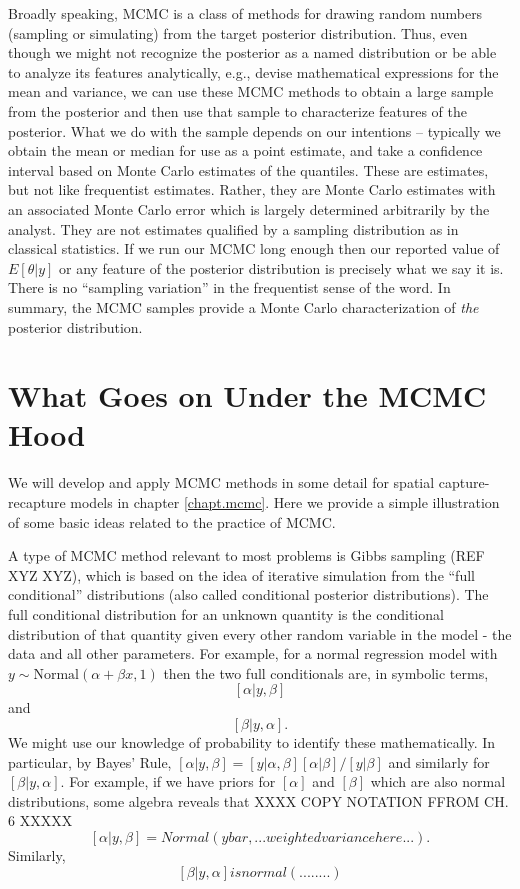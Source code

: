 Broadly speaking, MCMC is a class of methods for drawing random
numbers (sampling or simulating) from the target posterior
distribution.  Thus, even though we might not recognize the posterior
as a named distribution or be able to analyze its features
analytically, e.g., devise mathematical expressions for the mean and
variance, we can use these MCMC methods to obtain a large sample from
the posterior and then use that sample to characterize features of the
posterior. What we do with the sample depends on our intentions --
typically we obtain the mean or median for use as a point estimate,
and take a confidence interval based on Monte Carlo estimates of the
quantiles.  These are estimates, but not like frequentist
estimates. Rather, they are Monte Carlo estimates with an associated
Monte Carlo error which is largely determined arbitrarily by the
analyst. They are not estimates qualified by a sampling distribution
as in classical statistics. If we run our MCMC long enough then our
reported value of $E[\theta|y]$ or any feature of the posterior
distribution is precisely what we say it is. There is no ``sampling
variation'' in the frequentist sense of the word.  In summary, the
MCMC samples provide a Monte Carlo characterization of {\it the}
posterior distribution.


\section{What Goes on Under the MCMC Hood}

We will develop and apply MCMC methods in some detail for spatial
capture-recapture models in chapter \ref{chapt.mcmc}. Here we provide
a simple illustration of some basic ideas related to the practice of MCMC.

A type of MCMC method relevant to most problems is Gibbs sampling (REF
XYZ XYZ),
which is based on the idea of iterative simulation from the ``full
conditional'' distributions (also called conditional posterior
distributions). The full conditional distribution for an unknown
quantity is the conditional distribution of that quantity given every
other random variable in the model - the data and all other
parameters. For example, for a normal regression model with $y \sim
\mbox{Normal}(\alpha + \beta x , 1)$ then the two full conditionals are, in
symbolic terms,
\[
[\alpha|y,\beta]
\]
 and
\[
[\beta|y,\alpha].
\]
We might use our knowledge of probability to identify these
mathematically. In particular, by Bayes' Rule, $[\alpha|y,\beta] =
[y|\alpha,\beta][\alpha|\beta]/[y|\beta]$ and similarly for
$[\beta|y,\alpha]$. For example, if we have priors for $[\alpha]$ and $[\beta]$
which are also normal distributions, some algebra reveals that
XXXX COPY NOTATION FFROM CH. 6 XXXXX
\[
[\alpha|y,\beta] = Normal(ybar,...weighted variance here...).
\]
Similarly,
\[
 [\beta|y,\alpha] is normal(........)
\]

